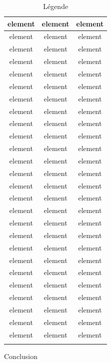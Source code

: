 \documentclass[small]{zmdocument}
\begin{document}
\begin{longtabu}{|c|c|c|} \hline
element & element & element\\ \hline
element & element & element\\ \hline
element & element & element\\ \hline
element & element & element\\ \hline
element & element & element\\ \hline
element & element & element\\ \hline
element & element & element\\ \hline
element & element & element\\ \hline
element & element & element\\ \hline
element & element & element\\ \hline
element & element & element\\ \hline
element & element & element\\ \hline
element & element & element\\ \hline
element & element & element\\ \hline
element & element & element\\ \hline
element & element & element\\ \hline
element & element & element\\ \hline
element & element & element\\ \hline
element & element & element\\ \hline
element & element & element\\ \hline
element & element & element\\ \hline
element & element & element\\ \hline
element & element & element\\ \hline
element & element & element\\ \hline
element & element & element\\ \hline
element & element & element\\ \hline
\caption{Légende}
\end{longtabu}

Conclusion
\end{document}
